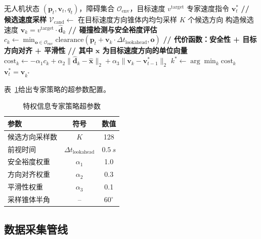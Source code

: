 \begin{algorithm}[htbp]
\caption{特权信息专家策略}
\label{alg:expert}
\begin{algorithmic}[1]
\Require 无人机状态 $(\mathbf{p}_t, \mathbf{v}_t, q_t)$，障碍集合 $\mathcal{O}_{\text{env}}$，目标速度 $v^{\text{target}}$
\Ensure 专家速度指令 $\mathbf{v}_t^*$
\State \textbf{// 候选速度采样}
\State $\mathcal{V}_{\text{cand}} \leftarrow$ 在目标速度方向锥体内均匀采样 $K$ 个候选方向
  \State 构造候选速度 $\mathbf{v}_k = v^{\text{target}} \cdot \hat{\mathbf{d}}_k$
  \State \textbf{// 碰撞检测与安全裕度评估}
  \State $c_k \leftarrow \min_{\mathbf{o} \in \mathcal{O}_{\text{env}}} \text{clearance}(\mathbf{p}_t + \mathbf{v}_k \cdot \Delta t_{\text{lookahead}}, \mathbf{o})$
  \State \textbf{// 代价函数：安全性 + 目标方向对齐 + 平滑性}
  \State \textbf{// 其中 $\hat{\mathbf{x}}$ 为目标速度方向的单位向量}
  \State $\text{cost}_k \leftarrow -\alpha_1 c_k + \alpha_2 \|\hat{\mathbf{d}}_k - \hat{\mathbf{x}}\|_2 + \alpha_3 \|\mathbf{v}_k - \mathbf{v}_{t-1}^*\|_2$
\EndFor
\State $k^* \leftarrow \arg\min_k \text{cost}_k$
\State \Return $\mathbf{v}_t^* = \mathbf{v}_{k^*}$
\end{algorithmic}
\end{algorithm}

表~\ref{tab:expert_params}给出专家策略的超参数配置。

\begin{table}[htbp]
\centering
\caption{特权信息专家策略超参数}
\label{tab:expert_params}
\begin{tabular}{lcc}
\toprule
\textbf{参数} & \textbf{符号} & \textbf{数值} \\
\midrule
候选方向采样数 & $K$ & 128 \\
前视时间 & $\Delta t_{\text{lookahead}}$ & $\SI{0.5}{s}$ \\
安全裕度权重 & $\alpha_1$ & 1.0 \\
方向对齐权重 & $\alpha_2$ & 0.3 \\
平滑性权重 & $\alpha_3$ & 0.1 \\
采样锥体半角 & -- & $60^\circ$ \\
\bottomrule
\end{tabular}
\end{table}

\FloatBarrier

\subsection{数据采集管线}

